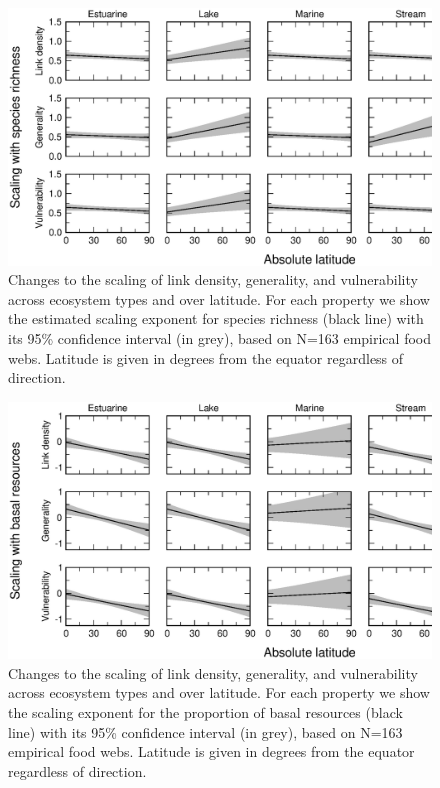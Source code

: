 \documentclass[12pt]{article}
\begin{document}
\newpage


\begin{figure}[h]
\centerline{\includegraphics*[width=.8\textwidth]{Figures/by_TL/marginal/S_marginal_latitude_proportions.eps}}
\caption{Changes to the scaling of link density, generality, and vulnerability across ecosystem
types and over latitude. For each property we show the estimated scaling exponent for species richness (black
line) with its 95\% confidence interval (in grey),
based on N=163 empirical food webs. Latitude is 
given in degrees from the equator
regardless of direction.}
\label{S}
\end{figure}


\begin{figure}[!h]
\centerline{\includegraphics*[width=.8\textwidth]{Figures/by_TL/marginal/B_marginal_latitude_proportions.eps}}
\caption{Changes to the scaling of link density, generality, and vulnerability across ecosystem
types and over latitude. For each property we show the scaling exponent for the proportion of
basal resources (black line) with its 95\% confidence interval (in grey), based on N=163 
empirical food webs. Latitude is given in degrees
from the equator regardless of direction.}
\label{B}
\end{figure}
\end{document}
